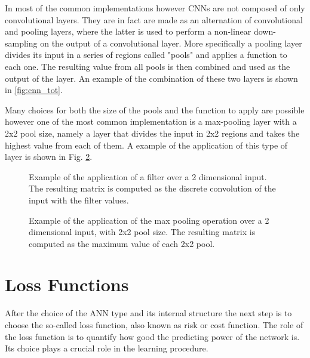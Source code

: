 \documentclass[../../main.tex]{subfiles}
\begin{document}
In most of the common implementations however CNNs are not composed of only convolutional layers. They are in fact are made as an alternation of convolutional and pooling layers, where the latter is used to  perform a non-linear down-sampling on the output of a convolutional layer. 
More specifically a pooling layer divides its input in a series of regions called "pools" and applies a function to each one.
The resulting value from all pools is then combined and used as the output of the layer.
An example of the combination of these two layers is shown in \ref{fig:cnn_tot}.

Many choices for both the size of the pools and the function to apply are possible however one of the most common implementation is a max-pooling layer with a 2x2 pool size, namely a layer that divides the input in 2x2 regions and takes the highest value from each of them. A example of the application of this type of layer is shown in Fig. \ref{fig:cnn_pool}. 

\begin{figure}[h]
    \centering
    
    \caption{Example of the application of a filter over a 2 dimensional input. The resulting matrix is computed as the discrete convolution of the input with the filter values.}
    \label{fig:cnn_filter}
\end{figure}

\begin{figure}[h]
    \centering
    \caption{Example of the application of the max pooling operation over a 2 dimensional input, with 2x2 pool size. The resulting matrix is computed as the maximum value of each 2x2 pool.}
    \label{fig:cnn_pool}
\end{figure}


%  
  
\section{Loss Functions}
\label{sec:NN_loss}

After the choice of the ANN type and its internal structure the next step is to choose the so-called loss function, also known as risk or cost function\cite{lossfunc}. The role of the loss function is to quantify how good the predicting power of the network is. Its choice plays a crucial role in the learning procedure.  
\end{document}
